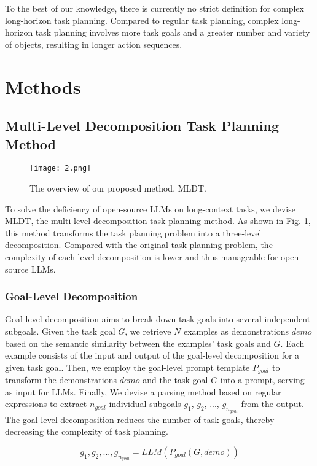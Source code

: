 To the best of our knowledge, there is currently no strict definition for complex long-horizon task planning. Compared to regular task planning, complex long-horizon task planning involves more task goals and a greater number and variety of objects, resulting in longer action sequences.

\section{Methods}

\subsection{Multi-Level Decomposition Task Planning Method}

\begin{figure}[h]
    \centering
    \texttt{[image: 2.png]}
    \caption{The overview of our proposed method, MLDT.}
    \label{Figure 2}
\end{figure}

To solve the deficiency of open-source LLMs on long-context tasks, we devise MLDT, the multi-level decomposition task planning method. As shown in Fig. \ref{Figure 2}, this method transforms the task planning problem into a three-level decomposition. Compared with the original task planning problem, the complexity of each level decomposition is lower and thus manageable for open-source LLMs. 

\subsubsection{Goal-Level Decomposition} 

Goal-level decomposition aims to break down task goals into several independent subgoals. Given the task goal $G$, we retrieve $N$ examples as demonstrations $demo$ based on the semantic similarity between the examples' task goals and $G$. Each example consists of the input and output of the goal-level decomposition for a given task goal. Then, we employ the goal-level prompt template $P_{goal}$ to transform the demonstrations $demo$ and the task goal $G$ into a prompt, serving as input for LLMs. Finally, We devise a parsing method based on regular expressions to extract $n_{goal}$ individual subgoals $g_1$, $g_2$, ..., $g_{n_{goal}}$ from the output. The goal-level decomposition reduces the number of task goals, thereby decreasing the complexity of task planning.

\begin{equation}
    g_1, g_2, ..., g_{n_{goal}}=LLM(P_{goal}(G, demo))
\end{equation}

